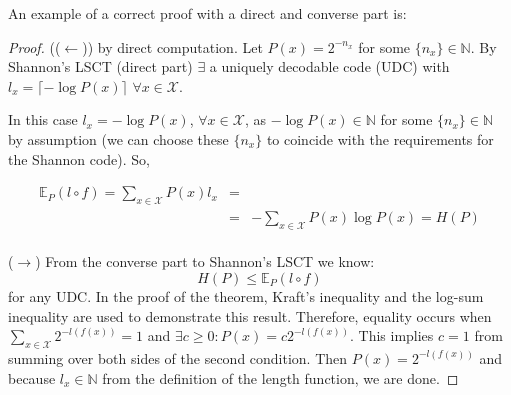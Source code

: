 \documentclass[11pt]{article}
\begin{document}
An example of a correct proof with a direct and converse part is:

\begin{proof}

((\(\leftarrow\))) by direct computation. Let \(P\left(x\right) = 2^{-n_x}\) for some \(\{n_x\} \in \mathbb{N}\). By Shannon's LSCT (direct part) \(\exists\) a uniquely decodable code (UDC) with \(l_x = \lceil -\log{P\left(x\right)}\rceil\) \(\forall x \in \mathcal{X}\). 

In this case \(l_x = -\log{P\left(x\right)}\), \(\forall x \in \mathcal{X}\), as \(-\log{P\left(x\right)} \in \mathbb{N}\) for some \(\{n_x\} \in \mathbb{N}\) by assumption (we can choose these \(\{n_x\}\) to coincide with the requirements for the Shannon code). So,

\begin{align}
\mathbb{E}_P \left( l \circ f \right) = \sum_{x \in \mathcal{X}} P\left(x\right)l_x &=& \\
&=& - \sum_{x \in \mathcal{X}} P\left(x\right) \log{P\left(x\right)} = H\left(P\right)
\end{align}
\\
(\(\rightarrow\)) From the converse part to Shannon's LSCT we know:
\begin{equation}
H\left(P\right) \leq \mathbb{E}_P \left(l \circ f\right)
\end{equation}
for any UDC.
In the proof of the theorem, Kraft's inequality and the log-sum inequality are used to demonstrate this result. Therefore, equality occurs when \( \sum_{x \in \mathcal{X}} 2^{-l\left(f\left(x\right)\right)} = 1 \) and \( \exists c\geq 0 : P\left(x\right) = c 2^{-l\left(f \left( x \right)\right)} \). This implies \(c = 1\) from summing over both sides of the second condition. Then \(P\left(x\right) = 2^{-l\left(f \left( x \right)\right)} \) and because \(l_x \in \mathbb{N}\) from the definition of the length function, we are done.
\end{proof}
\end{document}
